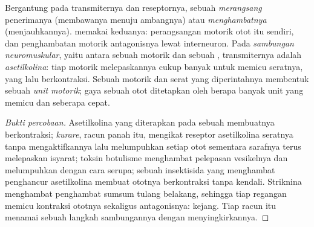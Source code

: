 \begin{proposition}\label{prop:g12:stretch-reflex:junction}
Bergantung pada transmiternya dan reseptornya, sebuah 
\emph{merangsang}  penerimanya (membawanya menuju ambangnya)
atau \emph{menghambatnya} (menjauhkannya).  memakai
keduanya: perangsangan  motorik otot itu sendiri, dan penghambatan
 motorik antagonisnya lewat interneuron. Pada \emph{sambungan
neuromuskular}, yaitu  antara sebuah  motorik dan sebuah
, transmiternya adalah \emph{asetilkolina}: tiap   motorik melepaskannya cukup banyak untuk memicu seratnya,
yang lalu berkontraksi. Sebuah  motorik dan serat yang
diperintahnya membentuk sebuah \emph{unit motorik}; gaya sebuah otot
ditetapkan oleh berapa banyak unit yang memicu dan seberapa cepat.
\end{proposition}
\begin{proof}[Bukti percobaan]
Asetilkolina yang diterapkan pada sebuah  membuatnya
berkontraksi; \emph{kurare}, racun panah itu, mengikat reseptor
asetilkolina seratnya tanpa mengaktifkannya lalu melumpuhkan setiap
otot sementara sarafnya terus melepaskan isyarat; toksin botulisme
menghambat pelepasan vesikelnya dan melumpuhkan dengan cara serupa;
sebuah insektisida yang menghambat  penghancur asetilkolina
membuat ototnya berkontraksi tanpa kendali. Striknina menghambat
 penghambat sumsum tulang belakang, sehingga tiap regangan
memicu kontraksi ototnya sekaligus antagonisnya: kejang. Tiap racun itu
menamai sebuah langkah sambungannya dengan menyingkirkannya.
\end{proof}

